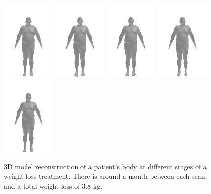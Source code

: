 \begin{figure}
	\centering
	\includegraphics[width=75pt]{files/patient_8/8_2}
	\includegraphics[width=75pt]{files/patient_8/8_3}
	\includegraphics[width=75pt]{files/patient_8/8_4}
	\includegraphics[width=75pt]{files/patient_8/8_5}
	\includegraphics[width=75pt]{files/patient_8/8_6}
	\caption[Reconstructed 3D body of a patient's scans]{3D model reconstruction of a patient's body at different stages of a weight loss
		treatment. There is around a month between each scan, and a total
		weight loss of 3.8 kg.}
\end{figure}

